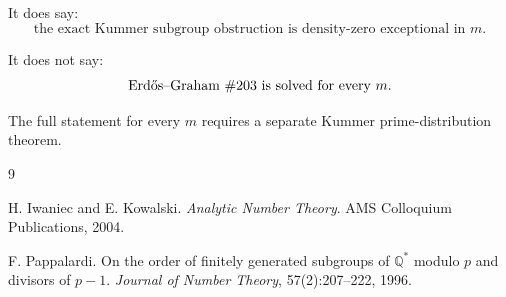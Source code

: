 \documentclass[11pt]{article}
\newcommand{\1}{\mathbf 1}
\begin{document}
It does say:
\[
\text{the exact Kummer subgroup obstruction is density-zero exceptional in }m.
\]

It does not say:
\[
\text{Erd\H{o}s--Graham \#203 is solved for every }m.
\]

The full statement for every \(m\) requires a separate Kummer prime-distribution theorem.


\begin{thebibliography}{9}

H. Iwaniec and E. Kowalski.
\newblock \emph{Analytic Number Theory}.
\newblock AMS Colloquium Publications, 2004.

F. Pappalardi.
\newblock On the order of finitely generated subgroups of \(\mathbb Q^*\) modulo \(p\) and divisors of \(p-1\).
\newblock \emph{Journal of Number Theory}, 57(2):207--222, 1996.

\end{thebibliography}
\end{document}
